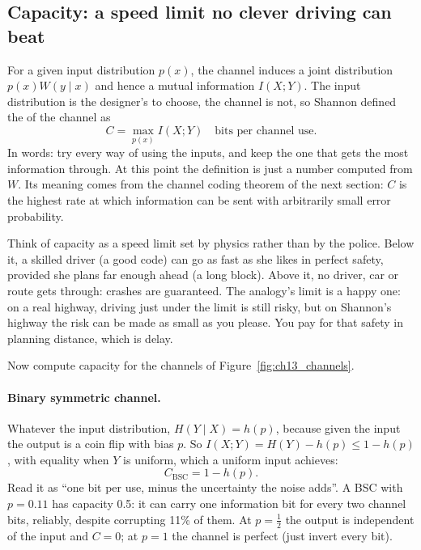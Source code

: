 \subsection{Capacity: a speed limit no clever driving can beat}

For a given input distribution $p(x)$, the channel induces a joint distribution
$p(x)W(y\mid x)$ and hence a mutual information $I(X;Y)$. The input distribution is the designer's
to choose, the channel is not, so Shannon defined the  of the channel as
\begin{equation}
C=\max_{p(x)}I(X;Y)\quad\text{bits per channel use}.
\label{eq:ch13:capacity}
\end{equation}
In words: try every way of using the inputs, and keep the one that gets the most information
through. At this point the definition is just a number computed from $W$. Its meaning comes from
the channel coding theorem of the next section: $C$ is the highest rate at which information can
be sent with arbitrarily small error probability.

\begin{analogy}
Think of capacity as a speed limit set by physics rather than by the police. Below it, a skilled
driver (a good code) can go as fast as she likes in perfect safety, provided she plans far enough
ahead (a long block). Above it, no driver, car or route gets through: crashes are guaranteed. The
analogy's limit is a happy one: on a real highway, driving just under the limit is still risky,
but on Shannon's highway the risk can be made as small as you please. You pay for that safety in
planning distance, which is delay.
\end{analogy}

Now compute capacity for the channels of Figure~\ref{fig:ch13_channels}.

\paragraph{Binary symmetric channel.} Whatever the input distribution,
$H(Y\mid X)=h(p)$, because given the input the output is a coin flip with bias $p$. So
$I(X;Y)=H(Y)-h(p)\le1-h(p)$, with equality when $Y$ is uniform, which a uniform input achieves:
\begin{equation}
C_{\text{BSC}}=1-h(p).
\label{eq:ch13:bsc}
\end{equation}
Read it as ``one bit per use, minus the uncertainty the noise adds''. A BSC with $p=0.11$ has
capacity 0.5: it can carry one information bit for every two channel bits, reliably, despite
corrupting 11\% of them. At $p=\frac12$ the output is independent of the input and $C=0$; at $p=1$
the channel is perfect (just invert every bit).

